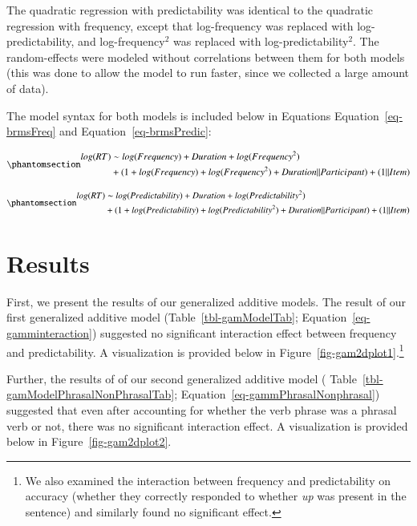 \documentclass[
  authoryear,
  preprint,
  1p,
  onecolumn]{elsarticle}
\begin{document}
The quadratic regression with predictability was identical to the
quadratic regression with frequency, except that log-frequency was
replaced with log-predictability, and log-frequency\(^2\) was replaced
with log-predictability\(^2\). The random-effects were modeled without
correlations between them for both models (this was done to allow the
model to run faster, since we collected a large amount of data).

The model syntax for both models is included below in Equations
Equation~\ref{eq-brmsFreq} and Equation~\ref{eq-brmsPredic}:

\begin{equation}\phantomsection\label{eq-brmsFreq}{
\begin{aligned}
log(RT) & \sim log(Frequency) + Duration + log(Frequency^2) \\ & + (1 + log(Frequency) + log(Frequency^2) + Duration || Participant) + (1 || Item)
\end{aligned}
}\end{equation}

\begin{equation}\phantomsection\label{eq-brmsPredic}{
\begin{aligned}
log(RT) & \sim log(Predictability) + Duration + log(Predictability^2) \\ & + (1 + log(Predictability) + log(Predictability^2) + Duration || Participant) + (1 || Item)
\end{aligned}
}\end{equation}

\section{Results}\label{results}

First, we present the results of our generalized additive models. The
result of our first generalized additive model
(Table~\ref{tbl-gamModelTab}; Equation~\ref{eq-gamminteraction})
suggested no significant interaction effect between frequency and
predictability. A visualization is provided below in
Figure~\ref{fig-gam2dplot1}.\footnote{We also examined the interaction
  between frequency and predictability on accuracy (whether they
  correctly responded to whether \emph{up} was present in the sentence)
  and similarly found no significant effect.}

Further, the results of of our second generalized additive model (
Table~\ref{tbl-gamModelPhrasalNonPhrasalTab};
Equation~\ref{eq-gammPhrasalNonphrasal}) suggested that even after
accounting for whether the verb phrase was a phrasal verb or not, there
was no significant interaction effect. A visualization is provided below
in Figure~\ref{fig-gam2dplot2}.
\end{document}
